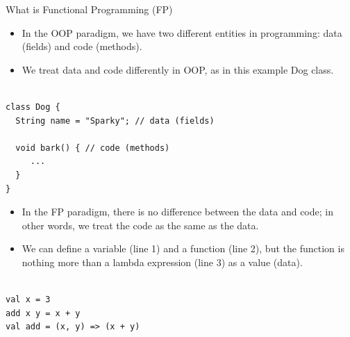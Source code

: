 \begin{frame}[fragile]{What is Functional Programming (FP)}

\begin{itemize}
	\item In the OOP paradigm, we have two different entities in programming: data (fields) and code (methods).
	\item We treat data and code differently in OOP, as in this example Dog class.  
\end{itemize}

\begin{Code}{}%
\begin{lstlisting}[firstnumber=1, label=glabels, xleftmargin=0pt, basicstyle=\scriptsize]% 

class Dog {
  String name = "Sparky"; // data (fields)
  
  void bark() { // code (methods)
     ... 
  }
}
\end{lstlisting}%
\end{Code}%
\end{frame}

\begin{frame}[fragile]{}

\begin{itemize}
	\item In the FP paradigm, there is no difference between the data and code; in other words, we treat the code as the same as the data.
	\item We can define a variable (line 1) and a function (line 2), but the function is nothing more than a lambda expression (line 3) as a value (data). 
\end{itemize}

\begin{Code}{}%
\begin{lstlisting}[firstnumber=1, label=glabels, xleftmargin=0pt, basicstyle=\small]% 

val x = 3
add x y = x + y
val add = (x, y) => (x + y) 
\end{lstlisting}%
\end{Code}%
\end{frame}

